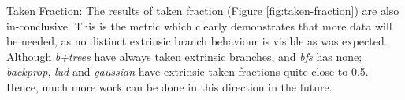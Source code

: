 \par{Taken Fraction: The results of taken fraction (Figure \ref{fig:taken-fraction}) are also in-conclusive. This is the metric which clearly demonstrates that more data will be needed, as no distinct extrinsic branch behaviour is visible as was expected. Although \textsl{b+trees} have always taken extrinsic branches, and \textsl{bfs} has none; \textsl{backprop}, \textsl{lud} and \textsl{gaussian} have extrinsic taken fractions quite close to 0.5. Hence, much more work can be done in this direction in the future.
}
